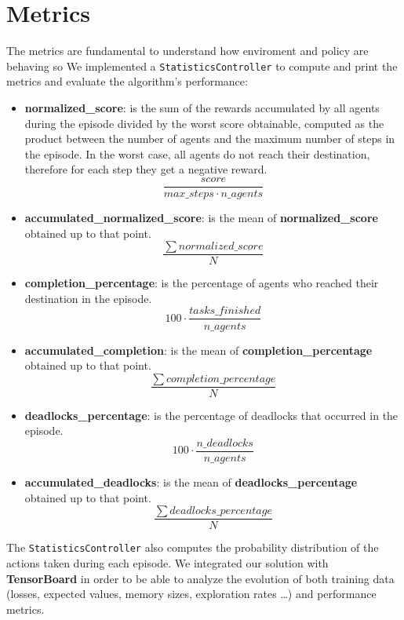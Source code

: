 \section{Metrics}
\label{sec:metrics}
The metrics are fundamental to understand how enviroment and policy are behaving so  We implemented a \texttt{StatisticsController} to compute and print the metrics and evaluate the algorithm’s performance:
\begin{itemize}
	\item \textbf{normalized\_score}: is the sum of the rewards accumulated by all agents during the episode divided by the worst score obtainable, computed as the product between the number of agents and the maximum number of steps in the episode.
	In the worst case, all agents do not reach their destination, therefore for each step they get a negative reward.
	\begin{equation}{\frac{score}{max\_steps \cdot n\_agents}}\label{eq:score}\end{equation}
	\item \textbf{accumulated\_normalized\_score}: is the mean of \textbf{normalized\_score} obtained up to that point.
	\begin{equation}{\frac{\sum{normalized\_score}}{N}}\label{eq:score_acc}\end{equation}
	\item \textbf{completion\_percentage}: is the percentage of agents who reached their destination in the episode.
	\begin{equation}{100 \cdot {\frac{tasks\_finished}{n\_agents}}}\label{eq:compl_perc}\end{equation}
	\item \textbf{accumulated\_completion}: is the mean of \textbf{completion\_percentage} obtained up to that point.
	\begin{equation}{\frac{\sum{completion\_percentage}}{N}}\label{eq:compl_acc}\end{equation}
	\item \textbf{deadlocks\_percentage}: is the percentage of deadlocks that occurred in the episode.
	\begin{equation}{100 \cdot {\frac{n\_deadlocks}{n\_agents}}}\label{eq:deads_perc}\end{equation}
	\item \textbf{accumulated\_deadlocks}: is the mean of \textbf{deadlocks\_percentage} obtained up to that point.
	\begin{equation}{\frac{\sum {deadlocks\_percentage}}{N}}\label{eq:deads_acc}\end{equation}
\end{itemize}
The \texttt{StatisticsController} also computes the probability distribution of the actions taken during each episode.
We integrated our solution with \textbf{TensorBoard} in order to be able to analyze the evolution of both training data (losses, expected values, memory sizes, exploration rates \ldots) and performance metrics.

